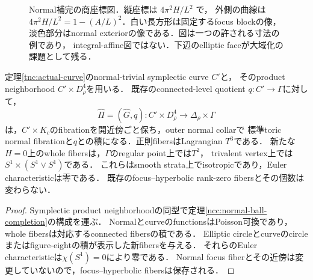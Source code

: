 \begin{figure}[htbp]
\centering
{}
\caption{Normal補完の商座標図．縦座標は $4\pi^2H/L^2$ で，
外側の曲線は $4\pi^2H/L^2=1-(A/L)^2$．白い長方形は固定するfocus blockの像，
淡色部分はnormal exteriorの像である．図は一つの許される寸法の例であり，
integral-affine図ではない．下辺のelliptic faceが大域化の課題として残る．}
\label{ncc:fig:completion-base}
\end{figure}

\begin{corollary}
\label{ncc:product-completion}
定理\ref{tnc:actual-curve}のnormal-trivial symplectic curve $C'$と，
そのproduct neighborhood $C'\times D^4_\rho$を用いる．
既存のconnected-level quotient $q:C'\to\Gamma$に対して，
\[
 \widehat\Pi=(\widehat G,q):C'\times D^4_\rho
              \longrightarrow\Delta_\rho\times\Gamma
\]
は，$C'\times K_c$のfibrationを開近傍ごと保ち，outer normal collarで
標準toric normal fibrationと$q$との積になる．正則fibersはLagrangian $T^3$である．
新たな$H=0$上のwhole fibersは，$\Gamma$のregular point上では$T^2$，
trivalent vertex上では$S^1\times(S^1\vee S^1)$である．
これらはsmooth strata上でisotropicであり，Euler characteristicは零である．
既存のfocus--hyperbolic rank-zero fibersとその個数は変わらない．
\end{corollary}

\begin{proof}
Symplectic product neighborhoodの同型で定理\ref{ncc:normal-ball-completion}の構成を運ぶ．
NormalとcurveのfunctionsはPoisson可換であり，whole fibersは対応するconnected fibersの積である．
Elliptic circleとcurveのcircleまたはfigure-eightの積が表示した新fibersを与える．
それらのEuler characteristicは$\chi(S^1)=0$により零である．
Normal focus fiberとその近傍は変更していないので，focus--hyperbolic fibersは保存される．
\end{proof}

